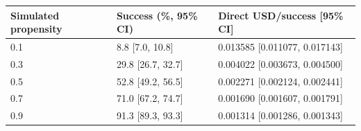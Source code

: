 \begin{tabular}{lll}\toprule
Simulated propensity & Success (\%, 95\% CI) & Direct USD/success [95\% CI] \\\midrule
0.1 & 8.8 [7.0, 10.8] & 0.013585 [0.011077, 0.017143] \\
0.3 & 29.8 [26.7, 32.7] & 0.004022 [0.003673, 0.004500] \\
0.5 & 52.8 [49.2, 56.5] & 0.002271 [0.002124, 0.002441] \\
0.7 & 71.0 [67.2, 74.7] & 0.001690 [0.001607, 0.001791] \\
0.9 & 91.3 [89.3, 93.3] & 0.001314 [0.001286, 0.001343] \\
\bottomrule\end{tabular}
